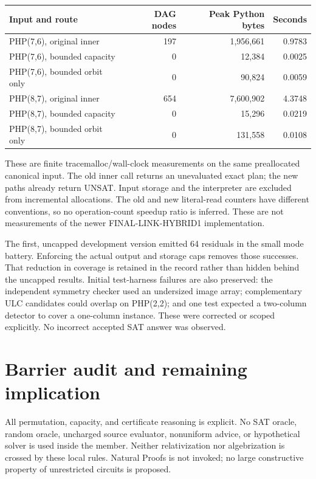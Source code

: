 \documentclass[11pt]{article}
\begin{document}
\begin{center}
\begin{tabular}{lrrr}
\toprule
Input and route & DAG nodes & Peak Python bytes & Seconds \\
\midrule
PHP(7,6), original inner & 197 & 1,956,661 & 0.9783 \\
PHP(7,6), bounded capacity & 0 & 12,384 & 0.0025 \\
PHP(7,6), bounded orbit only & 0 & 90,824 & 0.0059 \\
PHP(8,7), original inner & 654 & 7,600,902 & 4.3748 \\
PHP(8,7), bounded capacity & 0 & 15,296 & 0.0219 \\
PHP(8,7), bounded orbit only & 0 & 131,558 & 0.0108 \\
\bottomrule
\end{tabular}
\end{center}

These are finite tracemalloc/wall-clock measurements on the same preallocated
canonical input. The old inner call returns an unevaluated exact plan; the
new paths already return UNSAT. Input storage and the interpreter are excluded
from incremental allocations. The old and new literal-read counters have
different conventions, so no operation-count speedup ratio is inferred.
These are not measurements of the newer FINAL-LINK-HYBRID1 implementation.

The first, uncapped development version emitted 64 residuals in the small
mode battery. Enforcing the actual output and storage caps removes those
successes. That reduction in coverage is retained in the record rather than
hidden behind the uncapped results. Initial test-harness failures are also
preserved: the independent symmetry checker used an undersized image array;
complementary ULC candidates could overlap on PHP(2,2); and one test expected
a two-column detector to cover a one-column instance. These were corrected
or scoped explicitly. No incorrect accepted SAT answer was observed.

\section{Barrier audit and remaining implication}
All permutation, capacity, and certificate reasoning is explicit. No SAT
oracle, random oracle, uncharged source evaluator, nonuniform advice, or
hypothetical solver is used inside the member. Neither relativization nor
algebrization is crossed by these local rules. Natural Proofs is not invoked;
no large constructive property of unrestricted circuits is proposed.
\end{document}
